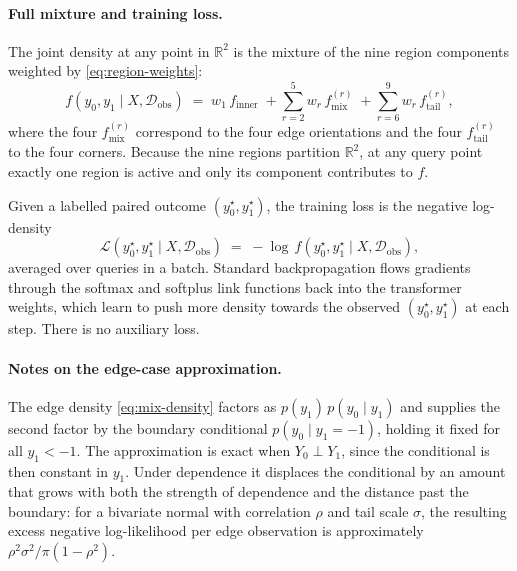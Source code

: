 \documentclass[11pt]{article}
\theoremstyle{plain}
\theoremstyle{definition}
\theoremstyle{remark}
\begin{document}
\paragraph{Full mixture and training loss.}
The joint density at any point in $\mathbb{R}^2$ is the mixture of the
nine region components weighted by
\eqref{eq:region-weights}:
\begin{equation}
  f(y_0, y_1 \mid X, \mathcal{D}_{\mathrm{obs}})
  \;=\;
  w_{1}\, f_{\mathrm{inner}}
  \;+\!\sum_{r = 2}^{5}\! w_{r}\, f^{(r)}_{\mathrm{mix}}
  \;+\!\sum_{r = 6}^{9}\! w_{r}\, f^{(r)}_{\mathrm{tail}},
  \label{eq:full-density}
\end{equation}
where the four $f^{(r)}_{\mathrm{mix}}$ correspond to the four edge
orientations and the four $f^{(r)}_{\mathrm{tail}}$ to the four
corners. Because the nine regions partition $\mathbb{R}^2$, at any
query point exactly one region is active and only its component
contributes to $f$.

Given a labelled paired outcome $(y_0^\star, y_1^\star)$, the training
loss is the negative log-density
\begin{equation}
  \mathcal{L}(y_0^\star, y_1^\star \mid X, \mathcal{D}_{\mathrm{obs}})
  \;=\;
  -\log\, f(y_0^\star, y_1^\star \mid X, \mathcal{D}_{\mathrm{obs}}),
  \label{eq:nll}
\end{equation}
averaged over queries in a batch. Standard backpropagation flows
gradients through the softmax and softplus link functions back into
the transformer weights, which learn to push more density towards the
observed $(y_0^\star, y_1^\star)$ at each step. There is no auxiliary
loss.

\paragraph{Notes on the edge-case approximation.}
\label{sec:2d-bardistribution:notes}
The edge density \eqref{eq:mix-density} factors as
$p(y_1)\,p(y_0 \mid y_1)$ and supplies the second factor by the boundary
conditional $p(y_0 \mid y_1 = -1)$, holding it fixed for all
$y_1 < -1$. The approximation is exact when $Y_0 \perp Y_1$, since the
conditional is then constant in $y_1$. Under dependence it displaces the
conditional by an amount that grows with both the strength of dependence
and the distance past the boundary: for a bivariate normal with
correlation $\rho$ and tail scale $\sigma$, the resulting excess
negative log-likelihood per edge observation is approximately
$\rho^{2}\sigma^{2} / \pi(1 - \rho^{2})$.
\end{document}

